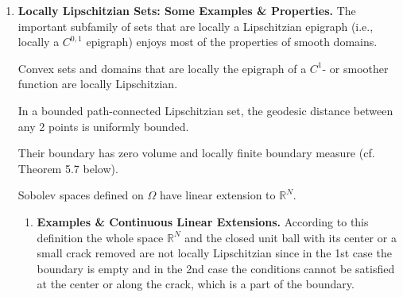 \documentclass{book}
\numberwithin{equation}{section}
\newtheorem{example}{Example}[section]
\begin{document}
\begin{enumerate}
\begin{example}
        Associate with $\lambda$ and a real $\delta > 0$ the set
        \begin{align*}
            \Omega := \left\{\left(x_1,x_2\right)\in\mathbb{R}^2;0 < x_1 < 1,\ \left|x_2 - \lambda\left(x_1\right)\right| < \delta x_1\right\}
        \end{align*}
        The set $\Omega$ is the image of the triangle
        \begin{align*}
            \Omega_0 := \left\{\left(x_1,x_2\right)\in\mathbb{R}^2;0 < x_1 < 1,\ \left|x_2\right| < \delta x_1\right\}
        \end{align*}
        through the $C^{0,1}$-homeomorphism
        \begin{align*}
            T\left(x_1,x_2\right) := \left(x_1,x_2 + \lambda\left(x_1\right)\right),\ T^{-1}\left(y_1,y_2\right) = \left(y_1,y_2 - \lambda\left(y_1\right)\right).
        \end{align*}
        Since the triangle $\Omega_0$ is Lipschitzian, its image is a set of class $C^{0,1}$.
        
        But $\Omega$ is not locally Lipschitzian in $(0,0)$ since $\Omega$ zigzags like a lightning bolt as it gets closer to the origin.
        
        Thus, however small the neighborhood around $(0,0)$, a direction ${\bf e}_N(0,0)$ cannot be found to make the domain locally the epigraph of a function.
    \end{example}
    \item \textbf{Locally Lipschitzian Sets: Some Examples \& Properties.} The important subfamily of sets that are locally a Lipschitzian epigraph (i.e., locally a $C^{0,1}$ epigraph) enjoys most of the properties of smooth domains.
    
    Convex sets and domains that are locally the epigraph of a $C^1$- or smoother function are locally Lipschitzian.
    
    In a bounded path-connected Lipschitzian set, the geodesic distance between any 2 points is uniformly bounded.
    
    Their boundary has zero volume and locally finite boundary measure (cf. Theorem 5.7 below).
    
    Sobolev spaces defined on $\Omega$ have linear extension to $\mathbb{R}^N$.
    \begin{enumerate}
        \item \textbf{Examples \& Continuous Linear Extensions.} According to this definition the whole space $\mathbb{R}^N$ and the closed unit ball with its center or a small crack removed are not locally Lipschitzian since in the 1st case the boundary is empty and in the 2nd case the conditions cannot be satisfied at the center or along the crack, which is a part of the boundary.
        

\end{enumerate}
\end{enumerate}
\end{document}
